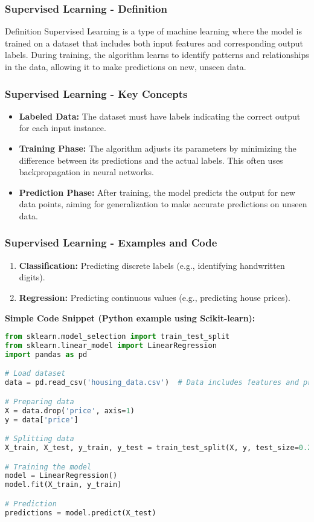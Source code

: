\documentclass[aspectratio=169]{beamer}
\begin{document}
\begin{frame}[fragile]
  \frametitle{Supervised Learning - Definition}
  \begin{block}{Definition}
    Supervised Learning is a type of machine learning where the model is trained on a dataset that includes both input features and corresponding output labels. During training, the algorithm learns to identify patterns and relationships in the data, allowing it to make predictions on new, unseen data.
  \end{block}
\end{frame}

\begin{frame}[fragile]
  \frametitle{Supervised Learning - Key Concepts}
  \begin{itemize}
    \item \textbf{Labeled Data:} The dataset must have labels indicating the correct output for each input instance.
    \item \textbf{Training Phase:} The algorithm adjusts its parameters by minimizing the difference between its predictions and the actual labels. This often uses backpropagation in neural networks.
    \item \textbf{Prediction Phase:} After training, the model predicts the output for new data points, aiming for generalization to make accurate predictions on unseen data.
  \end{itemize}
\end{frame}

\begin{frame}[fragile]
  \frametitle{Supervised Learning - Examples and Code}
  \begin{enumerate}
    \item \textbf{Classification:} Predicting discrete labels (e.g., identifying handwritten digits).
    \item \textbf{Regression:} Predicting continuous values (e.g., predicting house prices).
  \end{enumerate}
  
  \textbf{Simple Code Snippet (Python example using Scikit-learn):}
  \begin{lstlisting}[language=Python]
from sklearn.model_selection import train_test_split
from sklearn.linear_model import LinearRegression
import pandas as pd

# Load dataset
data = pd.read_csv('housing_data.csv')  # Data includes features and price label

# Preparing data
X = data.drop('price', axis=1)
y = data['price']

# Splitting data
X_train, X_test, y_train, y_test = train_test_split(X, y, test_size=0.2, random_state=42)

# Training the model
model = LinearRegression()
model.fit(X_train, y_train)

# Prediction
predictions = model.predict(X_test)
  \end{lstlisting}
\end{frame}
\end{document}
